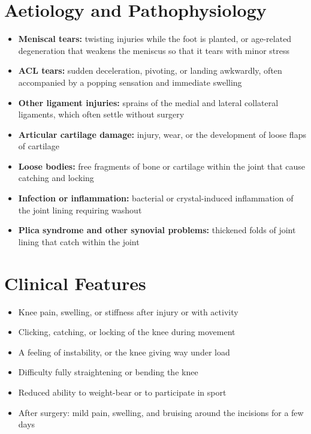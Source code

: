 \section*{Aetiology and Pathophysiology}
\begin{itemize}
    \item \textbf{Meniscal tears:} twisting injuries while the foot is planted, or age-related degeneration that weakens the meniscus so that it tears with minor stress
    \item \textbf{ACL tears:} sudden deceleration, pivoting, or landing awkwardly, often accompanied by a popping sensation and immediate swelling
    \item \textbf{Other ligament injuries:} sprains of the medial and lateral collateral ligaments, which often settle without surgery
    \item \textbf{Articular cartilage damage:} injury, wear, or the development of loose flaps of cartilage
    \item \textbf{Loose bodies:} free fragments of bone or cartilage within the joint that cause catching and locking
    \item \textbf{Infection or inflammation:} bacterial or crystal-induced inflammation of the joint lining requiring washout
    \item \textbf{Plica syndrome and other synovial problems:} thickened folds of joint lining that catch within the joint
\end{itemize}

\section*{Clinical Features}
\begin{itemize}
    \item Knee pain, swelling, or stiffness after injury or with activity
    \item Clicking, catching, or locking of the knee during movement
    \item A feeling of instability, or the knee giving way under load
    \item Difficulty fully straightening or bending the knee
    \item Reduced ability to weight-bear or to participate in sport
    \item After surgery: mild pain, swelling, and bruising around the incisions for a few days
\end{itemize}

